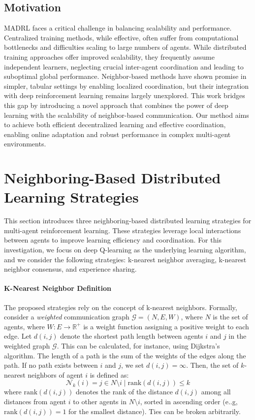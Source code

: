 \documentclass[sigconf]{acmart}
\begin{document}
\subsection{Motivation}
MADRL faces a critical challenge in balancing scalability and performance.  
Centralized training methods, while effective, often suffer from computational bottlenecks and difficulties scaling to large numbers of agents. 
While distributed training approaches offer improved scalability, 
they frequently assume independent learners, 
neglecting crucial inter-agent coordination and leading to suboptimal global performance.  
%
Neighbor-based methods have shown promise in simpler, 
tabular settings by enabling localized coordination,
but their integration with deep reinforcement learning remains largely unexplored. 
This work bridges this gap by introducing a novel approach that combines the power of deep learning with the scalability of neighbor-based communication.  
Our method aims to achieve both efficient decentralized learning and effective coordination, 
enabling online adaptation and robust performance in complex multi-agent environments.

\section{Neighboring-Based Distributed Learning Strategies}\label{sec:neighboring}
This section introduces three neighboring-based distributed learning strategies for multi-agent reinforcement learning.
These strategies leverage local interactions between agents to improve learning efficiency and coordination.
For this investigation, we focus on deep Q-learning as the underlying learning algorithm,
and we consider the following strategies: k-nearest neighbor averaging, k-nearest neighbor consensus, and experience sharing.

\paragraph{K-Nearest Neighbor Definition}
The proposed strategies rely on the concept of k-nearest neighbors.
Formally, consider a \emph{weighted} communication graph $\mathcal{G} = (N, E, W)$, where $N$ is the set of agents, where $W: E \rightarrow \mathbb{R}^+$ is a weight function assigning a positive weight to each edge.  
Let $d(i,j)$ denote the shortest path length between agents $i$ and $j$ in the weighted graph $\mathcal{G}$. 
This can be calculated, for instance, using Dijkstra's algorithm. 
The length of a path is the sum of the weights of the edges along the path. 
If no path exists between $i$ and $j$, we set $d(i,j) = \infty$.
%
Then, the set of $k$-nearest neighbors of agent $i$ is defined as:
$$ \mathcal{N}_k(i) = { j \in N \setminus {i} \mid \text{rank}(d(i,j)) \leq k } $$
where $\text{rank}(d(i,j))$ denotes the rank of the distance $d(i,j)$ among all distances from agent $i$ to other agents in $N \setminus {i}$, sorted in ascending order (e..g, $\text{rank}(d(i,j)) = 1$ for the smallest distance).
Ties can be broken arbitrarily.
\end{document}
